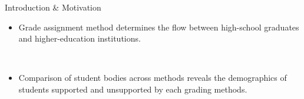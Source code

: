 \begin{frame}{Introduction \& Motivation}
    \begin{itemize}
        \item Grade assignment method determines the flow between high-school graduates and higher-education
        institutions.

        \

        \item Comparison of student bodies across methods reveals the demographics of students supported and
        unsupported by each grading methods.
    \end{itemize}
\end{frame}